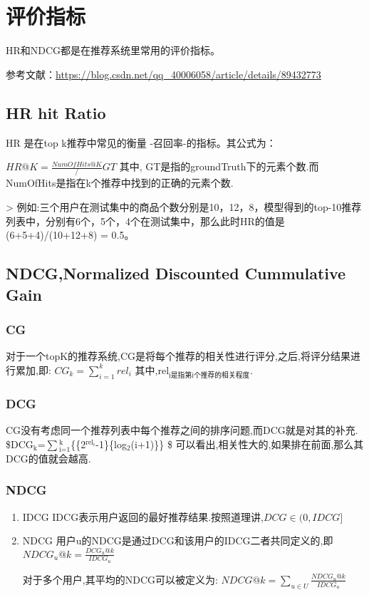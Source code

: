 \documentclass{article}
\date{\today}
\title{}
\begin{document}
\tableofcontents



\section{评价指标}
\label{sec:org4b7e001}
HR和NDCG都是在推荐系统里常用的评价指标。

参考文献：\url{https://blog.csdn.net/qq\_40006058/article/details/89432773}
\subsection{HR hit Ratio}
\label{sec:org2e1984a}
HR 是在top k推荐中常见的衡量 -召回率-的指标。其公式为：

\(HR@K=\frac{NumOfHits@K}/GT\)
其中, GT是指的groundTruth下的元素个数.而NumOfHits是指在k个推荐中找到的正确的元素个数.

> 例如:三个用户在测试集中的商品个数分别是10，12，8，模型得到的top-10推荐列表中，分别有6个，5个，4个在测试集中，那么此时HR的值是
(6+5+4)/(10+12+8) = 0.5。

\subsection{NDCG,Normalized Discounted Cummulative Gain}
\label{sec:orge36fe6e}
\subsubsection{CG}
\label{sec:org8cb0110}
对于一个topK的推荐系统,CG是将每个推荐的相关性进行评分,之后,将评分结果进行累加,即:
\(CG_k=\sum\limits_{i=1}^{k}{rel_i}\)
其中,rel\(_{\text{i是指第i个推荐的相关程度}}\).
\subsubsection{DCG}
\label{sec:orgfd58fd3}

CG没有考虑同一个推荐列表中每个推荐之间的排序问题,而DCG就是对其的补充.
\$DCG\(_{\text{k}}\)=\(\sum\)\limits\(_{\text{i=1}}^{\text{k}}\)\{\frac\{2\(^{\text{rel}_{\text{i}}}\)-1\}\{log\(_{\text{2}}\)(i+1)\}\} \$
可以看出,相关性大的,如果排在前面,那么其DCG的值就会越高.

\subsubsection{NDCG}
\label{sec:orgb69de4a}
\begin{enumerate}
\item IDCG
\label{sec:orgf7d6730}
IDCG表示用户返回的最好推荐结果.按照道理讲,\(DCG \in (0,IDCG]\)
\item NDCG
\label{sec:org515519b}
用户u的NDCG是通过DCG和该用户的IDCG二者共同定义的,即
\(NDCG_u@k=\frac{DCG_u@k}{IDCG_u}\)

对于多个用户,其平均的NDCG可以被定义为:
\(NDCG@k=\sum_{u \in U}{\frac{NDCG_u@k}{IDCG_u}}\)
\end{enumerate}
\end{document}
